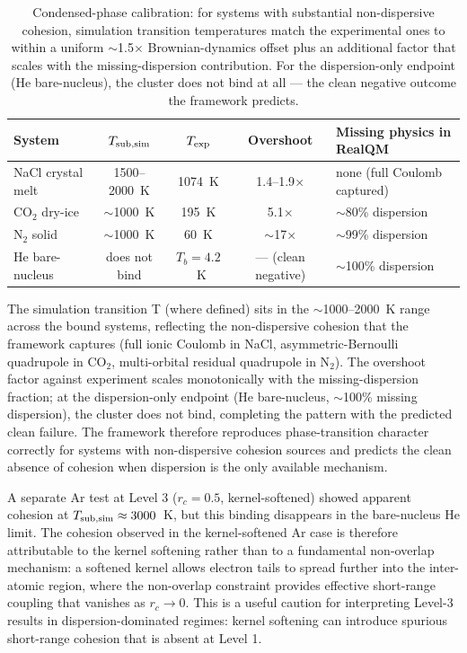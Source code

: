\documentclass[11pt]{article}
\begin{document}
\begin{table}[h!]
\centering
\small
\begin{tabular}{l c c c l}
\toprule
\textbf{System} & $T_{\rm sub,sim}$ & $T_{\rm exp}$ & \textbf{Overshoot} & \textbf{Missing physics in RealQM} \\
\midrule
NaCl crystal melt    & 1500--2000~K & 1074~K & 1.4--1.9$\times$ & none (full Coulomb captured) \\
CO$_2$ dry-ice       & $\sim$1000~K & 195~K  & 5.1$\times$       & $\sim$80\% dispersion \\
N$_2$ solid          & $\sim$1000~K & 60~K   & $\sim$17$\times$  & $\sim$99\% dispersion \\
He bare-nucleus      & does not bind & $T_b = 4.2$~K & --- (clean negative)  & $\sim$100\% dispersion \\
\bottomrule
\end{tabular}
\caption{Condensed-phase calibration: for systems with substantial non-dispersive cohesion, simulation transition temperatures match the experimental ones to within a uniform $\sim$1.5$\times$ Brownian-dynamics offset plus an additional factor that scales with the missing-dispersion contribution. For the dispersion-only endpoint (He bare-nucleus), the cluster does not bind at all --- the clean negative outcome the framework predicts.}
\label{tab:condensed}
\end{table}

The simulation transition T (where defined) sits in the $\sim$1000--2000~K range across the bound systems, reflecting the non-dispersive cohesion that the framework captures (full ionic Coulomb in NaCl, asymmetric-Bernoulli quadrupole in CO$_2$, multi-orbital residual quadrupole in N$_2$). The overshoot factor against experiment scales monotonically with the missing-dispersion fraction; at the dispersion-only endpoint (He bare-nucleus, $\sim$100\% missing dispersion), the cluster does not bind, completing the pattern with the predicted clean failure. The framework therefore reproduces phase-transition character correctly for systems with non-dispersive cohesion sources and predicts the clean absence of cohesion when dispersion is the only available mechanism.

A separate Ar test at Level 3 ($r_c = 0.5$, kernel-softened) showed apparent cohesion at $T_{\rm sub,sim} \approx 3000$~K, but this binding disappears in the bare-nucleus He limit. The cohesion observed in the kernel-softened Ar case is therefore attributable to the kernel softening rather than to a fundamental non-overlap mechanism: a softened kernel allows electron tails to spread further into the inter-atomic region, where the non-overlap constraint provides effective short-range coupling that vanishes as $r_c \to 0$. This is a useful caution for interpreting Level-3 results in dispersion-dominated regimes: kernel softening can introduce spurious short-range cohesion that is absent at Level 1.
\end{document}
